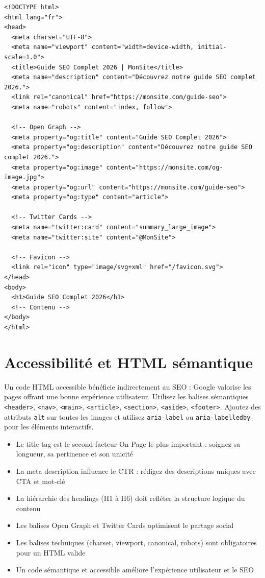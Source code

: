 \documentclass[12pt,a4paper,twoside]{report}
\begin{document}
\begin{lstlisting}[style=htmlcode,caption={Structure HTML complète avec toutes les balises optimisées}]
<!DOCTYPE html>
<html lang="fr">
<head>
  <meta charset="UTF-8">
  <meta name="viewport" content="width=device-width, initial-scale=1.0">
  <title>Guide SEO Complet 2026 | MonSite</title>
  <meta name="description" content="Découvrez notre guide SEO complet 2026.">
  <link rel="canonical" href="https://monsite.com/guide-seo">
  <meta name="robots" content="index, follow">

  <!-- Open Graph -->
  <meta property="og:title" content="Guide SEO Complet 2026">
  <meta property="og:description" content="Découvrez notre guide SEO complet 2026.">
  <meta property="og:image" content="https://monsite.com/og-image.jpg">
  <meta property="og:url" content="https://monsite.com/guide-seo">
  <meta property="og:type" content="article">

  <!-- Twitter Cards -->
  <meta name="twitter:card" content="summary_large_image">
  <meta name="twitter:site" content="@MonSite">

  <!-- Favicon -->
  <link rel="icon" type="image/svg+xml" href="/favicon.svg">
</head>
<body>
  <h1>Guide SEO Complet 2026</h1>
  <!-- Contenu -->
</body>
</html>
\end{lstlisting}

\section{Accessibilité et HTML sémantique}

Un code HTML accessible bénéficie indirectement au SEO : Google valorise les pages offrant une bonne expérience utilisateur. Utilisez les balises sémantiques \texttt{<header>}, \texttt{<nav>}, \texttt{<main>}, \texttt{<article>}, \texttt{<section>}, \texttt{<aside>}, \texttt{<footer>}. Ajoutez des attributs \texttt{alt} sur toutes les images et utilisez \texttt{aria-label} ou \texttt{aria-labelledby} pour les éléments interactifs.

\begin{takeaways}
\begin{itemize}
    \item Le title tag est le second facteur On-Page le plus important : soignez sa longueur, sa pertinence et son unicité
    \item La meta description influence le CTR : rédigez des descriptions uniques avec CTA et mot-clé
    \item La hiérarchie des headings (H1 à H6) doit refléter la structure logique du contenu
    \item Les balises Open Graph et Twitter Cards optimisent le partage social
    \item Les balises techniques (charset, viewport, canonical, robots) sont obligatoires pour un HTML valide
    \item Un code sémantique et accessible améliore l'expérience utilisateur et le SEO
\end{itemize}
\end{takeaways}
\end{document}
